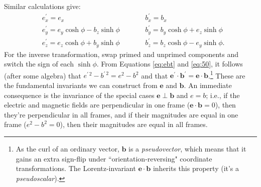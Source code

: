 \documentclass[12pt]{article}
\renewcommand{\vv}[1]{\mathbf{#1}}
\begin{document}
Similar calculations give:
\begin{equation}\label{eq:ebt}
\begin{aligned}
&e^\prime_x = e_x  \qquad \qquad& &b^\prime_x = b_x  \\
&e^\prime_y = e_y \cosh{\phi} - b_z \sinh{\phi}  \qquad& &b^\prime_y = b_y \cosh{\phi} + e_z \sinh{\phi} \\
&e^\prime_z = e_z \cosh{\phi} + b_y \sinh{\phi}  \qquad& &b^\prime_z = b_z \cosh{\phi} - e_y \sinh{\phi} .
\end{aligned}
\end{equation}
For the inverse transformation, swap primed and unprimed components and switch the sign of each $\sinh{\phi}$. From Equations \ref{eq:ebt} and \ref{eq:50}, it follows (after some algebra) that  ${e^{\prime \, 2} - b^{\prime \, 2} = e^2 - b^2}$ and that $\vv e^\prime \cdot \vv b^\prime = \vv e \cdot \vv b$.\footnote{\label{fn:ps}As the curl of an ordinary vector, $\vv b$ is a \emph{pseudovector}, which means that it gains an extra sign-flip under ``orientation-reversing" coordinate transformations. The Lorentz-invariant $\vv e \cdot \vv b$ inherits this property (it's a \emph{pseudoscalar}).} These are the fundamental invariants we can construct from $\vv e$ and $\vv b$. An immediate consequence is the invariance of the special cases $\vv e \perp \vv b$ and $e = b$; i.e., if the electric and magnetic fields are perpendicular in one frame ($\vv e \cdot \vv b = 0$), then they're perpendicular in all frames, and if their magnitudes are equal in one frame ($e^2 - b^2 = 0$), then their magnitudes are equal in all frames.
\end{document}

